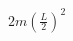\documentclass[preview]{standalone}
\begin{document}
\begin{align*}
2m(\frac{L}{2})^2
\end{align*}
\end{document}
